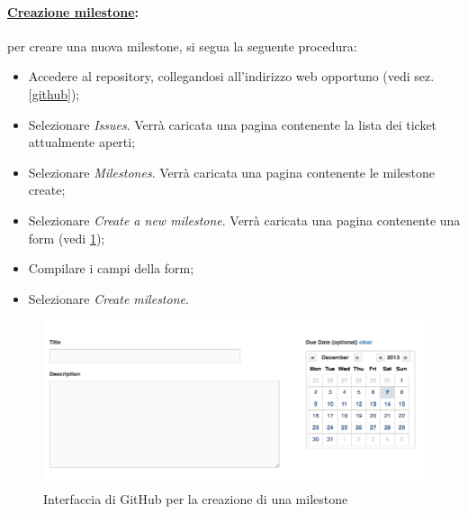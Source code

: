\paragraph{\underline{Creazione milestone}:} per creare una nuova milestone\g{}, si segua la seguente procedura:
\begin{itemize}
\item Accedere al repository\g{}, collegandosi all'indirizzo web opportuno (vedi sez.\ref{github});
\item Selezionare \textit{Issues}. Verrà caricata una pagina contenente la lista dei ticket attualmente aperti;
\item Selezionare \textit{Milestones}. Verrà caricata una pagina contenente le milestone\g{} create;
\item Selezionare \textit{Create a new milestone}. Verrà caricata una pagina contenente una form  (vedi \ref{github_milestone});
\item Compilare i campi della form;
\item Selezionare \textit{Create milestone}.
\end{itemize}
\begin{figure}[h]
	\centering
	\includegraphics[scale=0.5]{./content/Immagini/Screen1}
	\caption{Interfaccia di GitHub per la creazione di una milestone}
	\label{github_milestone}
\end{figure}

